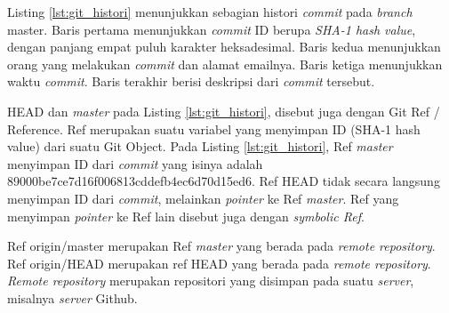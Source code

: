 Listing \ref{lst:git_histori} menunjukkan sebagian histori \textit{commit} pada \textit{branch} master. Baris pertama menunjukkan \textit{commit} ID berupa \textit{SHA-1 hash value}, dengan panjang empat puluh karakter heksadesimal. Baris kedua menunjukkan orang yang melakukan \textit{commit} dan alamat emailnya. Baris ketiga menunjukkan waktu \textit{commit}. Baris terakhir berisi deskripsi dari \textit{commit} tersebut.

HEAD dan \textit{master} pada Listing \ref{lst:git_histori}, disebut juga dengan Git Ref / Reference. Ref merupakan suatu variabel yang menyimpan ID (SHA-1 hash value) dari suatu Git Object. Pada Listing \ref{lst:git_histori}, Ref \textit{master} menyimpan ID dari \textit{commit} yang isinya adalah 89000be7ce7d16f006813cddefb4ec6d70d15ed6. Ref HEAD tidak secara langsung menyimpan ID dari \textit{commit}, melainkan \textit{pointer} ke Ref \textit{master}. Ref yang menyimpan \textit{pointer} ke Ref lain disebut juga dengan \textit{symbolic Ref}. 

Ref origin/master merupakan Ref \textit{master} yang berada pada \textit{remote repository}. 
Ref origin/HEAD merupakan ref HEAD yang berada pada \textit{remote repository}. \textit{Remote repository} merupakan repositori yang disimpan pada suatu \textit{server}, misalnya \textit{server} Github. 

